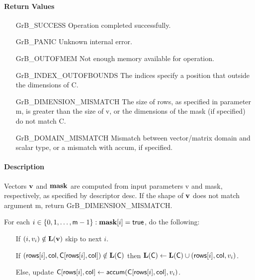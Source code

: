 \paragraph{Return Values}

\begin{itemize}[leftmargin=2.1in]
\item[{\sf GrB\_SUCCESS}]             Operation completed successfully.
\item[{\sf GrB\_PANIC}]               Unknown internal error.
\item[{\sf GrB\_OUTOFMEM}]            Not enough memory available for operation.
\item[{\sf GrB\_INDEX\_OUTOFBOUNDS}]  The indices specify a position that outside the dimensions of {\sf C}.
\item[{\sf GrB\_DIMENSION\_MISMATCH}] 
        The size of {\sf rows}, as specified in parameter {\sf m}, is greater than the size of {\sf v}, or
        the dimensions of the mask (if specified) do not match {\sf C}.
\item[{\sf GrB\_DOMAIN\_MISMATCH}]    Mismatch between vector/matrix domain and scalar type,
                                      or a mismatch with {\sf accum}, if specified.
\end{itemize}

\paragraph{Description}

Vectors ${\bf v}$ and ${\bf mask}$ are computed from input parameters {\sf v} and {\sf mask}, respectively,
as specified by descriptor {\sf desc}. If the shape of ${\bf v}$ does not match argument {\sf m},
return {\sf GrB\_DIMENSION\_MISMATCH}.

For each $i \in \{0, 1, \ldots, {\sf m}-1 \} : {\bf mask}[i] = {\sf true}$, do the following:
\begin{itemize}
	\item[] If $(i,v_{i}) \notin \bold{L}({\bf v})$ skip to next $i$.
	\item[] If $({\sf rows}[i], {\sf col}, {\sf C}[{\sf rows}[i],{\sf col}]) \notin \bold{L}({\sf C})$ then
	      $\bold{L}({\sf C}) \leftarrow \bold{L}({\sf C}) \cup ({\sf rows}[i],{\sf col},v_{i})$.
	\item[]  Else, update ${\sf C}[{\sf rows}[i],{\sf col}] \leftarrow {\sf accum}({\sf C}[{\sf rows}[i],{\sf col}],v_{i})$.
\end{itemize}


